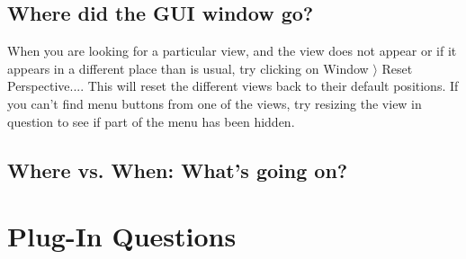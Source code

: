 \subsection{Where did the GUI window go?}

When you are looking for a particular view, and the view does not appear or if it appears in a different place than is usual, try clicking on \textsf{Window $\rangle $ Reset Perspective...}. This will reset the different views back to their default positions. If you can't find menu buttons from one of the views, try resizing the view in question to see if part of the menu has been hidden.

\subsection{Where vs. When: What's going on?}

\section{Plug-In Questions}


